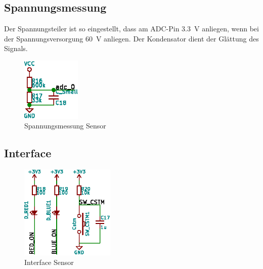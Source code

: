 \clearpage
\subsection{Spannungsmessung}
\label{subsec:hw:sensor:voltageSense}

Der  Spannungsteiler  ist  so  eingestellt, dass  am  ADC-Pin  \SI{3.3}{\volt}
anliegen,  wenn  bei  der Spannungsversorgung  \SI{60}{\volt}  anliegen.   Der
Kondensator  dient der Gl\"attung des Signals.

\begin{figure}[h!t]
    \centering
    \includegraphics[width=0.25\textwidth]{images/sensor-sch/sensor--sch--sensor.eps}
    \caption[Sensor: Schema Spannungsmessung]{Spannungsmessung Sensor}
\end{figure}


\subsection{Interface}
\label{subsec:hw:sensor:interface}

\begin{figure}[h!t]
    \centering
    \includegraphics[angle=-90,width=0.4\textwidth]{images/sensor-sch/sensor--sch--interface.eps}
    \caption[Sensor: Schema Interface]{Interface Sensor}
\end{figure}

